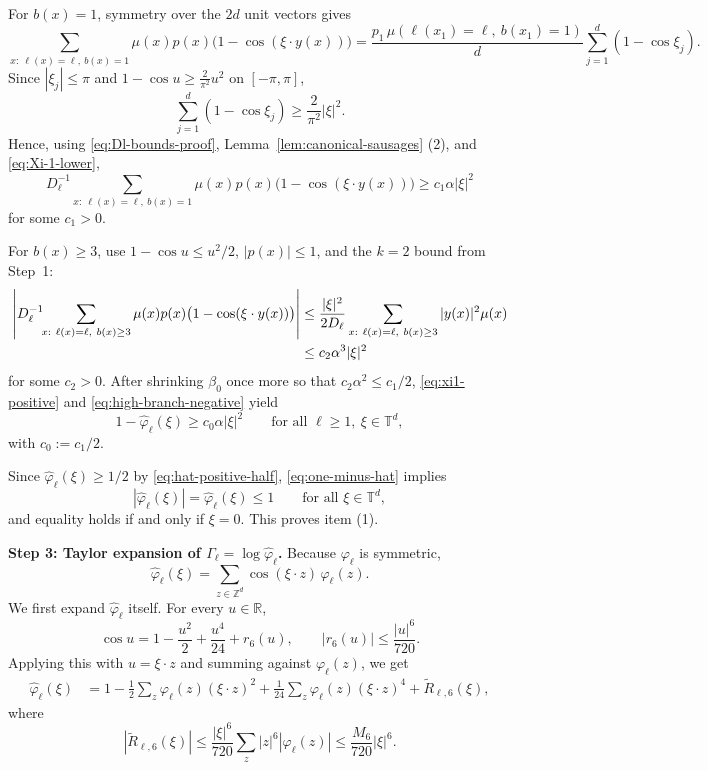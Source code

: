 \documentclass[letterpaper,11pt,reqno]{amsart}
\theoremstyle{definition}
\begin{document}
For \(b(x)=1\), symmetry over the \(2d\) unit vectors gives
\[
\sum_{x:\ \ell(x)=\ell,\ b(x)=1}\mu(x)p(x)\bigl(1-\cos(\xi\cdot y(x))\bigr)
=
\frac{p_1\,\mu(\ell(x_1)=\ell,\ b(x_1)=1)}{d}\sum_{j=1}^d(1-\cos\xi_j).
\]
Since \(|\xi_j|\le\pi\) and \(1-\cos u\ge \frac{2}{\pi^2}u^2\) on \([-\pi,\pi]\),
\[
\sum_{j=1}^d(1-\cos\xi_j)\ge \frac{2}{\pi^2}|\xi|^2.
\]
Hence, using \eqref{eq:Dl-bounds-proof}, Lemma~\ref{lem:canonical-sausages} (2), and \eqref{eq:Xi-1-lower},
\begin{equation}\label{eq:xi1-positive}
D_\ell^{-1}\!\!\sum_{x:\ \ell(x)=\ell,\ b(x)=1}\mu(x)p(x)\bigl(1-\cos(\xi\cdot y(x))\bigr)
\ge
c_1\alpha|\xi|^2
\end{equation}
for some \(c_1>0\).

For \(b(x)\ge3\), use \(1-\cos u\le u^2/2\), \(|p(x)|\le1\), and the \(k=2\) bound from Step~1:
\begin{align}
\left|
D_\ell^{-1}\!\!\sum_{x:\ \ell(x)=\ell,\ b(x)\ge3}\mu(x)p(x)\bigl(1-\cos(\xi\cdot y(x))\bigr)
\right|
&\le
\frac{|\xi|^2}{2D_\ell}\sum_{x:\ \ell(x)=\ell,\ b(x)\ge3}|y(x)|^2\mu(x)\notag\\
&\le
c_2\alpha^3|\xi|^2
\label{eq:high-branch-negative}
\end{align}
for some \(c_2>0\). After shrinking \(\beta_0\) once more so that \(c_2\alpha^2\le c_1/2\),
\eqref{eq:xi1-positive} and \eqref{eq:high-branch-negative} yield
\begin{equation}\label{eq:one-minus-hat}
1-\widehat\varphi_\ell(\xi)\ge c_0\alpha|\xi|^2
\qquad\text{for all }\ell\ge1,\ \xi\in\mathbb T^d,
\end{equation}
with \(c_0:=c_1/2\).

Since \(\widehat\varphi_\ell(\xi)\ge1/2\) by \eqref{eq:hat-positive-half}, \eqref{eq:one-minus-hat} implies
\[
|\widehat\varphi_\ell(\xi)|=\widehat\varphi_\ell(\xi)\le 1
\qquad\text{for all }\xi\in\mathbb T^d,
\]
and equality holds if and only if \(\xi=0\). This proves item (1).


\smallskip
\noindent\textbf{Step 3: Taylor expansion of \(\Gamma_\ell=\log\widehat\varphi_\ell\).}
Because \(\varphi_\ell\) is symmetric,
\[
\widehat\varphi_\ell(\xi)=\sum_{z\in\mathbb Z^d}\cos(\xi\cdot z)\,\varphi_\ell(z).
\]
We first expand \(\widehat\varphi_\ell\) itself. For every \(u\in\mathbb R\),
\[
\cos u = 1-\frac{u^2}{2}+\frac{u^4}{24}+r_6(u),
\qquad
|r_6(u)|\le \frac{|u|^6}{720}.
\]
Applying this with \(u=\xi\cdot z\) and summing against \(\varphi_\ell(z)\), we get
\begin{align}
\widehat\varphi_\ell(\xi)
&=
1-\frac12\sum_{z}\varphi_\ell(z)(\xi\cdot z)^2
+\frac1{24}\sum_{z}\varphi_\ell(z)(\xi\cdot z)^4
+\widetilde R_{\ell,6}(\xi),
\label{eq:hatphi-taylor}
\end{align}
where
\begin{equation*}
|\widetilde R_{\ell,6}(\xi)|
\le
\frac{|\xi|^6}{720}\sum_z |z|^6|\varphi_\ell(z)|
\le
\frac{M_6}{720}|\xi|^6.
\end{equation*}
\end{document}

